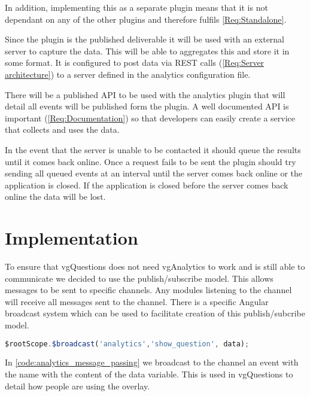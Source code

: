 In addition, implementing this as a separate plugin means that it is not dependant on any of the other plugins and therefore fulfils \cref{Req:Standalone}.

Since the plugin is the published deliverable it will be used with an external server to capture the data. This will be able to aggregates this and store it in some format. It is configured to post data via \gls{REST} calls (\cref{Req:Server architecture}) to a server defined in the analytics configuration file.

There will be a published \gls{API} to be used with the analytics plugin that will detail all events will be published form the plugin. A well documented API is important (\cref{Req:Documentation}) so that developers can easily create a service that collects and uses the data.

In the event that the server is unable to be contacted it should queue the results until it comes back online. Once a request fails to be sent the plugin should try sending all queued events at an interval until the server comes back online or the application is closed. If the application is closed before the server comes back online the data will be lost.

\section{Implementation}

To ensure that vgQuestions does not need vgAnalytics to work and is still able to communicate we decided to use the publish/subscribe model. This allows messages to be sent to specific channels. Any modules listening to the channel will receive all messages sent to the channel. There is a specific Angular broadcast system which can be used to facilitate creation of this publish/subcribe model.

\begin{lstlisting}[language=javascript,caption={AngularJS demonstrating the message passing interface used in the Analytics plugin},label={code:analytics_message_passing}]
$rootScope.$broadcast('analytics','show_question', data);
\end{lstlisting}

In \autoref{code:analytics_message_passing} we broadcast to the  channel an event with the name
 with the content of the data variable. This is used in \gls{vgQuestions} to detail how people are using the overlay.

